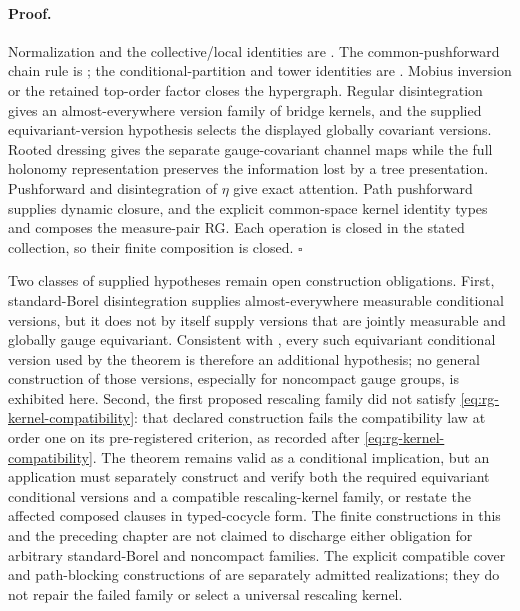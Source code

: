 \paragraph{Proof.}
Normalization and the collective/local identities are
.
The common-pushforward chain rule is ; the
conditional-partition and tower identities are .
Mobius inversion or the retained top-order factor closes the hypergraph.
Regular disintegration gives an almost-everywhere version family of bridge
kernels, and the supplied equivariant-version hypothesis selects the displayed
globally covariant versions.  Rooted dressing gives the
separate gauge-covariant channel maps while the full holonomy representation
preserves the information lost by a tree presentation.  Pushforward and
disintegration of $\eta$ give exact attention.  Path pushforward supplies
dynamic closure, and the explicit common-space kernel identity types and
composes the measure-pair RG.  Each operation is closed in the stated
collection, so their finite composition is closed.  $\square$

Two classes of supplied hypotheses remain open construction obligations.  First,
standard-Borel disintegration supplies almost-everywhere measurable conditional
versions, but it does not by itself supply versions that are jointly measurable
and globally gauge equivariant.  Consistent with
, every such equivariant conditional version used by
the theorem is therefore an additional hypothesis; no general construction of
those versions, especially for noncompact gauge groups, is exhibited here.
Second, the first proposed rescaling family did not satisfy
\eqref{eq:rg-kernel-compatibility}: that declared construction fails
the compatibility law at order one on its pre-registered criterion, as
recorded after \eqref{eq:rg-kernel-compatibility}.  The theorem remains valid
as a conditional implication, but an application must separately construct
and verify both the required equivariant conditional versions and a compatible
rescaling-kernel family, or restate the affected composed clauses in
typed-cocycle form.  The finite constructions in this and the preceding
chapter are not claimed to discharge either obligation for arbitrary
standard-Borel and noncompact families. The explicit compatible cover and
path-blocking constructions of 
are separately admitted realizations; they do not repair the failed family
or select a universal rescaling kernel. 

